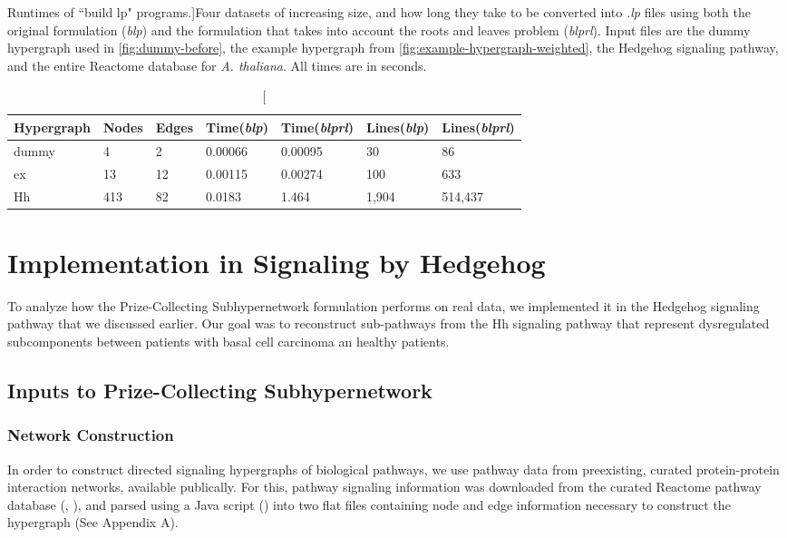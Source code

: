 \documentclass[12pt,twoside]{reedthesis}
\theoremstyle{definition}
\begin{document}
\begin{table}[!h]
\begin{center}
  \label{tab:build_lp_runtimes}
  \caption[Runtimes of ``build lp" programs.]{Four datasets of increasing size, and how long they take to be converted into \textit{.lp} files using both the original formulation (\textit{blp}) and the formulation that takes into account the roots and leaves problem (\textit{blprl}). Input files are the dummy hypergraph used in \ref{fig:dummy-before}, the example hypergraph from \ref{fig:example-hypergraph-weighted}, the Hedgehog signaling pathway, and the entire Reactome database for \textit{A. thaliana}. All times are in seconds.}
\begin{tabular}{ |l||l|l|l|l|l|l| }%
  \hline%
  Hypergraph & Nodes & Edges & Time(\textit{blp}) & Time(\textit{blprl}) & Lines(\textit{blp}) & Lines(\textit{blprl}) \\%
  \hline \hline
  dummy & 4 & 2 & 0.00066 & 0.00095 & 30 & 86 \\ \hline%
  ex & 13 & 12 & 0.00115 & 0.00274 & 100 & 633 \\ \hline%
  Hh & 413 & 82 & 0.0183 & 1.464 & 1,904 & 514,437  \\ \hline%
\end{tabular}%
\end{center}
\end{table}


\chapter{Implementation in Signaling by Hedgehog}

To analyze how the Prize-Collecting Subhypernetwork formulation performs on real data, we implemented it in the Hedgehog signaling pathway that we discussed earlier. Our goal was to reconstruct sub-pathways from the Hh signaling pathway that represent dysregulated subcomponents between patients with basal cell carcinoma an healthy patients.

\section{Inputs to Prize-Collecting Subhypernetwork}

  \subsection{Network Construction}
  In order to construct directed signaling hypergraphs of biological pathways, we use pathway data from preexisting, curated protein-protein interaction networks, available publically. For this, pathway signaling information was downloaded from the curated Reactome pathway database (\cite{Croft2014}, \cite{Milacic2012}), and parsed using a Java script (\cite{AnnaCorrespondence}) into two flat files containing node and edge information necessary to construct the hypergraph (See Appendix A).\par
\end{document}
